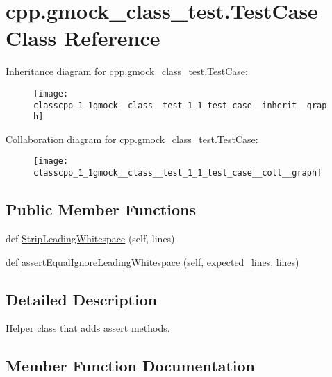 \hypertarget{classcpp_1_1gmock__class__test_1_1_test_case}{}\section{cpp.\+gmock\+\_\+class\+\_\+test.\+Test\+Case Class Reference}
\label{classcpp_1_1gmock__class__test_1_1_test_case}


Inheritance diagram for cpp.\+gmock\+\_\+class\+\_\+test.\+Test\+Case\+:
\nopagebreak
\begin{figure}[H]
\begin{center}
\leavevmode
\texttt{[image: classcpp\_1\_1gmock\_\_class\_\_test\_1\_1\_test\_case\_\_inherit\_\_graph]}
\end{center}
\end{figure}


Collaboration diagram for cpp.\+gmock\+\_\+class\+\_\+test.\+Test\+Case\+:
\nopagebreak
\begin{figure}[H]
\begin{center}
\leavevmode
\texttt{[image: classcpp\_1\_1gmock\_\_class\_\_test\_1\_1\_test\_case\_\_coll\_\_graph]}
\end{center}
\end{figure}
\subsection*{Public Member Functions}
\begin{DoxyCompactItemize}
\item 
def \hyperlink{classcpp_1_1gmock__class__test_1_1_test_case_a366b15717eebc41e397357868c5734c5}{Strip\+Leading\+Whitespace} (self, lines)
\item 
def \hyperlink{classcpp_1_1gmock__class__test_1_1_test_case_a68f88bba11511f8c582123d47bf80464}{assert\+Equal\+Ignore\+Leading\+Whitespace} (self, expected\+\_\+lines, lines)
\end{DoxyCompactItemize}


\subsection{Detailed Description}
\begin{DoxyVerb}Helper class that adds assert methods.\end{DoxyVerb}
 

\subsection{Member Function Documentation}

